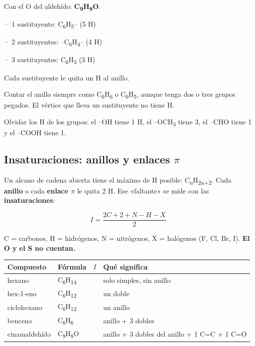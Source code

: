 Con el O del aldehído: \textbf{C\textsubscript{9}H\textsubscript{8}O}.

  
\begin{clave} · 1 sustituyente: C\textsubscript{6}H\textsubscript{5}-- (5 H)\par · 2 sustituyentes: --C\textsubscript{6}H\textsubscript{4}-- (4 H)\par · 3 sustituyentes: C\textsubscript{6}H\textsubscript{3} (3 H)\par Cada sustituyente le quita un H al anillo.\end{clave}
 
\begin{ojo} Contar el anillo siempre como C\textsubscript{6}H\textsubscript{6} o C\textsubscript{6}H\textsubscript{5}, aunque tenga dos o tres grupos pegados. El vértice que lleva un sustituyente no tiene H.\end{ojo}
 
\begin{ojo} Olvidar los H de los grupos: el --OH tiene 1 H, el --OCH\textsubscript{3} tiene 3, el --CHO tiene 1 y el --COOH tiene 1.\end{ojo}
\subsection{Insaturaciones: anillos y enlaces \ensuremath{\pi}}
Un alcano de cadena abierta tiene el máximo de H posible: C\textsubscript{n}H\textsubscript{2n+2}. Cada \textbf{anillo} o cada \textbf{enlace \ensuremath{\pi}} le quita 2 H. Ese «faltante» se mide con las \textbf{insaturaciones}:

 \[ I = \dfrac{2C + 2 + N - H - X}{2} \] 

C = carbonos, H = hidrógenos, N = nitrógenos, X = halógenos (F, Cl, Br, I). \textbf{El O y el S no cuentan.}

 
\begin{center}\small
\begin{tabularx}{\linewidth}{@{}>{\raggedright\arraybackslash\hsize=0.86\hsize}X>{\raggedright\arraybackslash\hsize=0.54\hsize}X>{\raggedright\arraybackslash\hsize=0.43\hsize}X>{\raggedright\arraybackslash\hsize=2.16\hsize}X@{}}
\toprule
\textbf{Compuesto} & \textbf{Fórmula} & \textbf{$I$} & \textbf{Qué significa} \\
\midrule
hexano & C\textsubscript{6}H\textsubscript{14} & 0 & solo simples, sin anillo \\
hex-1-eno & C\textsubscript{6}H\textsubscript{12} & 1 & un doble \\
ciclohexano & C\textsubscript{6}H\textsubscript{12} & 1 & un anillo \\
benceno & C\textsubscript{6}H\textsubscript{6} & 4 & 1 anillo + 3 dobles \\
cinamaldehído & C\textsubscript{9}H\textsubscript{8}O & 6 & 1 anillo + 3 dobles del anillo + 1 C=C + 1 C=O \\
\bottomrule
\end{tabularx}
\end{center}
  
